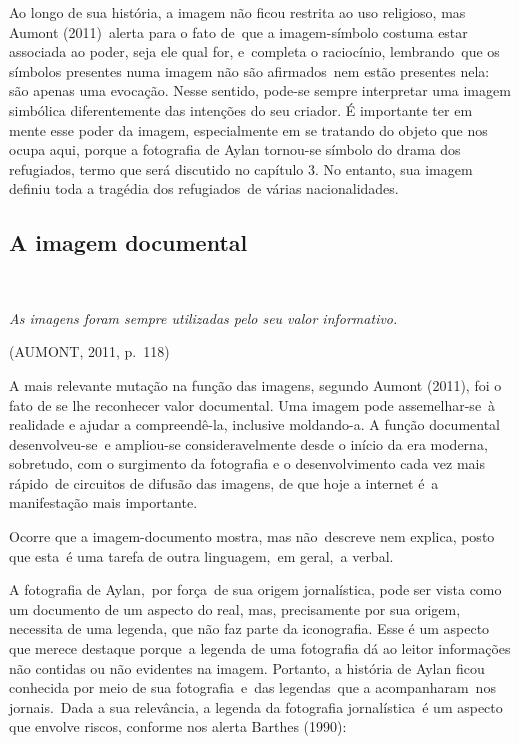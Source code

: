 \documentclass[
  letterpaper,
  a4paper,
  12pt]{scrbook}
\renewenvironment{quote}
  {\par\singlespacing\small\list{}{\rightmargin=0cm \leftmargin=4cm}%
   \item\relax}
  {\endlist}
\begin{document}
Ao longo de sua história, a imagem não ficou restrita ao uso religioso,
mas Aumont (2011)~alerta para o fato de~que a imagem-símbolo costuma
estar associada ao poder, seja ele qual for, e~completa o raciocínio,
lembrando~que os símbolos presentes numa imagem não são afirmados~nem
estão presentes nela: são apenas uma evocação. Nesse sentido, pode-se
sempre interpretar uma imagem simbólica diferentemente das intenções do
seu criador. É importante ter em mente esse poder da imagem,
especialmente em se tratando do objeto que nos ocupa aqui, porque a
fotografia de Aylan tornou-se símbolo do drama dos refugiados, termo que
será discutido no capítulo 3. No entanto, sua imagem definiu toda a
tragédia dos refugiados~de várias nacionalidades.~

\hypertarget{a-imagem-documental}{%
\subsection{A imagem documental~}\label{a-imagem-documental}}

~

\begin{quote}
\emph{As imagens foram sempre utilizadas pelo seu valor informativo.}
\end{quote}

(AUMONT, 2011, p.~118) ~

A mais relevante mutação na função das imagens, segundo Aumont (2011),
foi o fato de se lhe reconhecer valor documental. Uma imagem pode
assemelhar-se~à realidade e ajudar a compreendê-la, inclusive
moldando-a. A função documental desenvolveu-se~e ampliou-se
consideravelmente desde o início da era moderna, sobretudo, com o
surgimento da fotografia e o desenvolvimento cada vez mais rápido~de
circuitos de difusão das imagens, de que hoje a internet é~a
manifestação mais importante.~

Ocorre que a imagem-documento mostra, mas não~descreve nem explica,
posto que esta~é uma tarefa de outra linguagem,~em geral,~a verbal.~

A fotografia de Aylan,~por força~de sua origem jornalística, pode ser
vista como um documento de um aspecto do real, mas, precisamente por sua
origem, necessita de uma legenda, que não faz parte da iconografia. Esse
é um aspecto que merece destaque porque~a legenda de uma fotografia dá
ao leitor informações não contidas ou não evidentes na imagem. Portanto,
a história de Aylan ficou conhecida por meio de sua fotografia~e~das
legendas~que a acompanharam~nos jornais.~Dada a sua relevância, a
legenda da fotografia jornalística~é um aspecto que envolve riscos,
conforme nos alerta Barthes (1990):~ ~
\end{document}
